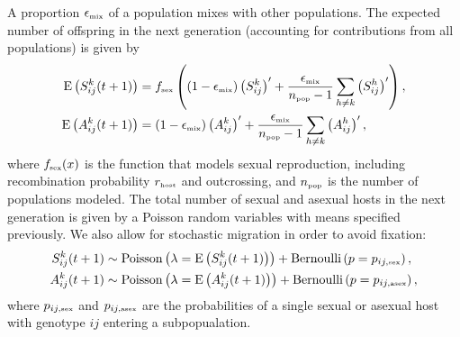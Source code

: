 \documentclass{article}\usepackage[]{graphicx}\usepackage[]{color}
\begin{document}
A proportion $\epsilon_{\textrm{\tiny mix}}$ of a population mixes with other populations.
The expected number of offspring in the next generation (accounting for contributions from all populations) is given by
\begin{equation}
\begin{aligned}
\mathrm{E}\left(S_{ij}^k(t+1)\right) &= f_{\textrm{\tiny sex}}\left((1 - \epsilon_{\textrm{\tiny mix}}) \left(S_{ij}^k\right)' + \frac{\epsilon_{\textrm{\tiny mix}}}{n_{\textrm{\tiny pop}}-1} \sum_{h \neq k} \left(S_{ij}^h\right)'\right),\\
\mathrm{E}\left(A_{ij}^k(t+1)\right) &= (1 - \epsilon_{\textrm{\tiny mix}}) \left(A_{ij}^k\right)' + \frac{\epsilon_{\textrm{\tiny mix}}}{n_{\textrm{\tiny pop}}-1} \sum_{h \neq k} \left(A_{ij}^h\right)',\\
\end{aligned}
\end{equation}
where $f_{\textrm{\tiny sex}}(x)$ is the function that models sexual reproduction, including recombination probability $r_{\textrm{\tiny host}}$ and outcrossing, and $n_{\textrm{\tiny pop}}$ is the number of populations modeled.
The total number of sexual and asexual hosts in the next generation is given by a Poisson random variables with means specified previously. We also allow for stochastic migration in order to avoid fixation:
\begin{equation}
\begin{aligned}
S_{ij}^k(t+1) &\sim \mathrm{Poisson}\left(\lambda=\mathrm{E}\left(S_{ij}^k(t+1)\right)\right) + \mathrm{Bernoulli}\left(p=p_{ij,\textrm{\tiny sex}}\right),\\
A_{ij}^k(t+1) &\sim \mathrm{Poisson}\left(\lambda=\mathrm{E}\left(A_{ij}^k(t+1)\right)\right) + \mathrm{Bernoulli}\left(p=p_{ij, \textrm{\tiny asex}}\right),
\end{aligned}
\end{equation}
where $p_{ij,\textrm{\tiny sex}}$ and $p_{ij, \textrm{\tiny asex}}$ are the probabilities of a single sexual or asexual host with genotype $ij$ entering a subpopualation.
\end{document}
